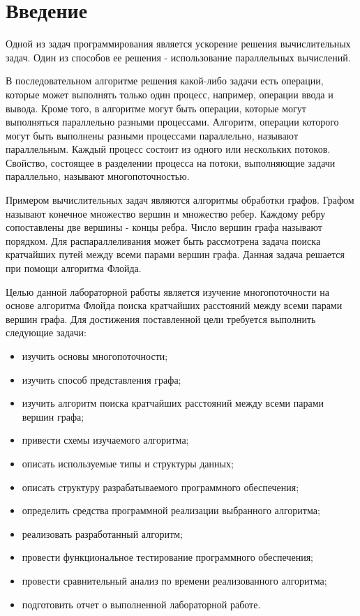 \chapter*{Введение}

Одной из задач программирования является ускорение решения вычислительных задач. Один из способов ее решения - использование параллельных вычислений.

В последовательном алгоритме решения какой-либо задачи есть операции, которые может выполнять только один процесс, например, операции ввода и вывода. Кроме того, в алгоритме могут быть операции, которые могут выполняться параллельно разными процессами. Алгоритм, операции которого могут быть выполнены разными процессами параллельно, называют параллельным. Каждый процесс состоит из одного или нескольких потоков. Свойство, состоящее в разделении процесса на потоки, выполняющие задачи параллельно, называют многопоточностью.

Примером вычислительных задач являются алгоритмы обработки графов. Графом называют конечное множество вершин и множество ребер. Каждому ребру сопоставлены две вершины - концы ребра. Число вершин графа называют порядком. Для распараллеливания может быть рассмотрена задача поиска кратчайших путей между всеми парами вершин графа. Данная задача решается при помощи алгоритма Флойда.

Целью данной лабораторной работы является изучение многопоточности на основе алгоритма Флойда поиска кратчайших расстояний между всеми парами вершин графа. Для достижения поставленной цели требуется выполнить следующие задачи:

\begin{itemize}
	\item изучить основы многопоточности;
	\item изучить способ представления графа;
	\item изучить алгоритм поиска кратчайших расстояний между всеми парами вершин графа;
	\item привести схемы изучаемого алгоритма;
	\item описать используемые типы и структуры данных;
	\item описать структуру разрабатываемого программного обеспечения;
	\item определить средства программной реализации выбранного алгоритма;
	\item реализовать разработанный алгоритм;
	\item провести функциональное тестирование программного обеспечения;
	\item провести сравнительный анализ по времени реализованного алгоритма;
	\item подготовить отчет о выполненной лабораторной работе.
\end{itemize}